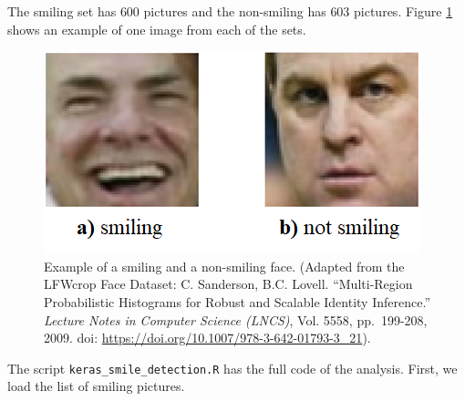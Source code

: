 \documentclass[
  11pt,
]{krantz}
\newenvironment{Shaded}{\begin{snugshade}}{\end{snugshade}}
\newcommand{\CommentTok}[1]{\textcolor[rgb]{0.37,0.37,0.37}{\textit{#1}}}
\newcommand{\FunctionTok}[1]{\textcolor[rgb]{0,0,0}{#1}}
\newcommand{\NormalTok}[1]{#1}
\newcommand{\OtherTok}[1]{\textcolor[rgb]{0.37,0.37,0.37}{#1}}
\newcommand{\SpecialCharTok}[1]{\textcolor[rgb]{0,0,0}{#1}}
\newcommand{\StringTok}[1]{\textcolor[rgb]{0.5,0.5,0.5}{#1}}
\begin{document}
The smiling set has \(600\) pictures and the non-smiling has \(603\) pictures. Figure \ref{fig:cnnSmileNotSmile} shows an example of one image from each of the sets.



\begin{figure}

{\centering \includegraphics[width=0.6\linewidth]{images/cnn_smilenosmile} 

}

\caption{Example of a smiling and a non-smiling face. (Adapted from the LFWcrop Face Dataset: C. Sanderson, B.C. Lovell. ``Multi-Region Probabilistic Histograms for Robust and Scalable Identity Inference.'' \emph{Lecture Notes in Computer Science (LNCS)}, Vol. 5558, pp.~199-208, 2009. doi: \url{https://doi.org/10.1007/978-3-642-01793-3_21}).}\label{fig:cnnSmileNotSmile}
\end{figure}

The script \texttt{keras\_smile\_detection.R} has the full code of the analysis. First, we load the list of smiling pictures.

\begin{Shaded}
\end{Shaded}
\end{document}
